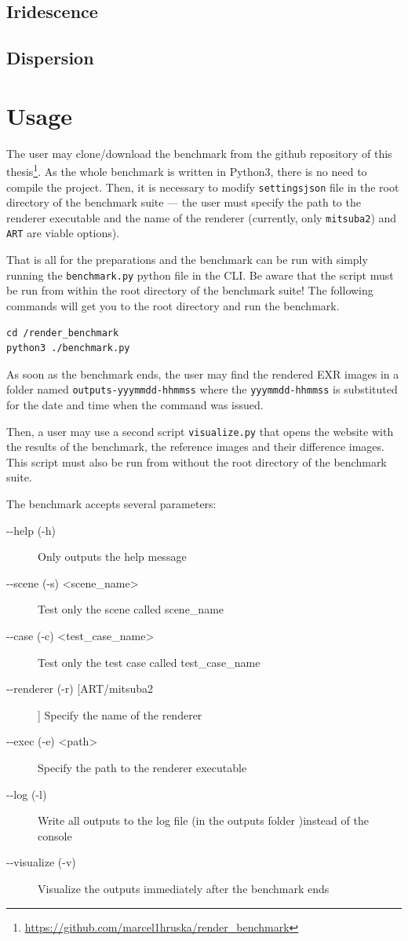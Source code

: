 \subsection{Iridescence}

\subsection{Dispersion}
\section{Usage}

The user may clone/download the benchmark from the github repository of this thesis\footnote{\url{https://github.com/marcel1hruska/render_benchmark}}. As the whole benchmark is written in Python3, there is no need to compile the project. Then, it is necessary to modify \texttt{settings\.json} file in the root directory of the benchmark suite --- the user must specify the path to the renderer executable and the name of the renderer (currently, only \texttt{mitsuba2}) and \texttt{ART} are viable options).

That is all for the preparations and the benchmark can be run with simply running the \texttt{benchmark.py} python file in the CLI. Be aware that the script must be run from within the root directory of the benchmark suite! The following commands will get you to the root directory and run the benchmark.

\begin{lstlisting}
cd /render_benchmark
python3 ./benchmark.py
\end{lstlisting}

As soon as the benchmark ends, the user may find the rendered EXR images in a folder named \texttt{outputs-yyymmdd-hhmmss} where the \texttt{yyymmdd-hhmmss} is substituted for the date and time when the command was issued.

Then, a user may use a second script \texttt{visualize.py} that opens the website with the results of the benchmark, the reference images and their difference images. This script must also be run from without the root directory of the benchmark suite.

The benchmark accepts several parameters:
\begin{description}
	\item[-{}-help (-h)] Only outputs the help message
	\item[-{}-scene (-s) \textless scene\_name\textgreater] Test only the scene called scene\_name
	\item[-{}-case (-c) \textless test\_case\_name\textgreater] Test only the test case called test\_case\_name
	\item[-{}-renderer (-r) [ART/mitsuba2]] Specify the name of the renderer 
	\item[-{}-exec (-e) \textless path\textgreater] Specify the path to the renderer executable
	\item[-{}-log (-l)] Write all outputs to the log file (in the outputs folder )instead of the console
	\item[-{}-visualize (-v)] Visualize the outputs immediately after the benchmark ends
\end{description}

